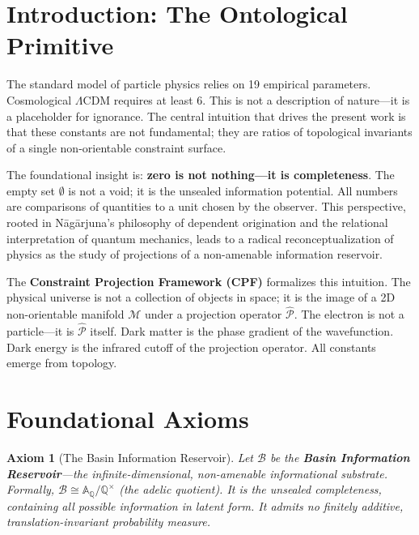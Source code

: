 \documentclass[11pt, a4paper, twocolumn]{article}
\theoremstyle{plain}
\newtheorem{axiom}{Axiom}
\theoremstyle{definition}
\begin{document}
\section{Introduction: The Ontological Primitive}
\label{sec:intro}

The standard model of particle physics relies on 19 empirical parameters. Cosmological $\Lambda$CDM requires at least 6. This is not a description of nature---it is a placeholder for ignorance. The central intuition that drives the present work is that these constants are not fundamental; they are ratios of topological invariants of a single non-orientable constraint surface.

The foundational insight is: \textbf{zero is not nothing---it is completeness}. The empty set $\emptyset$ is not a void; it is the unsealed information potential. All numbers are comparisons of quantities to a unit chosen by the observer. This perspective, rooted in Nāgārjuna's philosophy of dependent origination and the relational interpretation of quantum mechanics, leads to a radical reconceptualization of physics as the study of projections of a non-amenable information reservoir.

The \textbf{Constraint Projection Framework (CPF)} formalizes this intuition. The physical universe is not a collection of objects in space; it is the image of a 2D non-orientable manifold $\mathcal{M}$ under a projection operator $\hat{\mathcal{P}}$. The electron is not a particle---it is $\hat{\mathcal{P}}$ itself. Dark matter is the phase gradient of the wavefunction. Dark energy is the infrared cutoff of the projection operator. All constants emerge from topology.

\section{Foundational Axioms}
\label{sec:axioms}

\begin{axiom}[The Basin Information Reservoir]
Let $\mathcal{B}$ be the \textbf{Basin Information Reservoir}---the infinite-dimensional, non-amenable informational substrate. Formally, $\mathcal{B} \cong \mathbb{A}_\mathbb{Q} / \mathbb{Q}^\times$ (the adelic quotient). It is the unsealed completeness, containing all possible information in latent form. It admits no finitely additive, translation-invariant probability measure.
\end{axiom}
\end{document}
